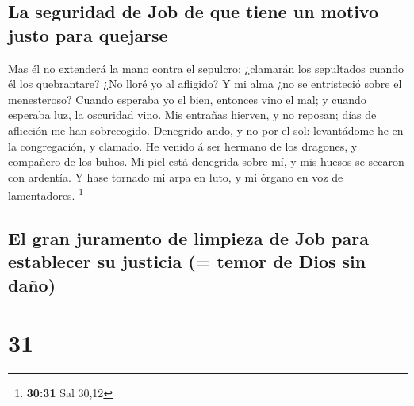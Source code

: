 \hypertarget{la-seguridad-de-job-de-que-tiene-un-motivo-justo-para-quejarse}{%
\subsection{La seguridad de Job de que tiene un motivo justo para
quejarse}\label{la-seguridad-de-job-de-que-tiene-un-motivo-justo-para-quejarse}}

 Mas él no extenderá la mano contra el sepulcro; ¿clamarán
los sepultados cuando él los quebrantare?  ¿No lloré yo al
afligido? Y mi alma ¿no se entristeció sobre el menesteroso?
 Cuando esperaba yo el bien, entonces vino el mal; y cuando
esperaba luz, la oscuridad vino.  Mis entrañas hierven, y
no reposan; días de aflicción me han sobrecogido. 
Denegrido ando, y no por el sol: levantádome he en la congregación, y
clamado.  He venido á ser hermano de los dragones, y
compañero de los buhos.  Mi piel está denegrida sobre mí, y
mis huesos se secaron con ardentía.  Y hase tornado mi arpa
en luto, y mi órgano en voz de lamentadores. \footnote{\textbf{30:31}
  Sal 30,12}

\hypertarget{el-gran-juramento-de-limpieza-de-job-para-establecer-su-justicia-temor-de-dios-sin-dauxf1o}{%
\subsection{El gran juramento de limpieza de Job para establecer su
justicia (= temor de Dios sin
daño)}\label{el-gran-juramento-de-limpieza-de-job-para-establecer-su-justicia-temor-de-dios-sin-dauxf1o}}

\hypertarget{section-30}{%
\section{31}\label{section-30}}

